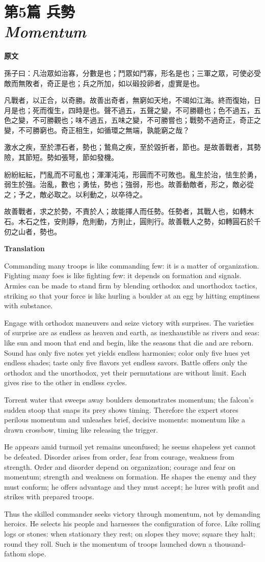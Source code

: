 \documentclass[12pt]{book}
\newcommand{\chapterentry}[4]{%
  \chapter[\texorpdfstring{#1}{#1}]{\texorpdfstring{#1\\\Large\textit{#2}}{#1 — #2}}%
  \noindent\textbf{原文}\par
  #3

  \bigskip
  \noindent\textbf{Translation}\par
  #4
}
\begin{document}
\chapterentry{第5篇 兵勢}{Momentum}{%
孫子曰：凡治眾如治寡，分數是也；鬥眾如鬥寡，形名是也；三軍之眾，可使必受敵而無敗者，奇正是也；兵之所加，如以碫投卵者，虛實是也。

凡戰者，以正合，以奇勝。故善出奇者，無窮如天地，不竭如江海。終而復始，日月是也；死而復生，四時是也。聲不過五，五聲之變，不可勝聽也；色不過五，五色之變，不可勝觀也；味不過五，五味之變，不可勝嘗也；戰勢不過奇正，奇正之變，不可勝窮也。奇正相生，如循環之無端，孰能窮之哉？

激水之疾，至於漂石者，勢也；鷙鳥之疾，至於毀折者，節也。是故善戰者，其勢險，其節短。勢如張弩，節如發機。

紛紛紜紜，鬥亂而不可亂也；渾渾沌沌，形圓而不可敗也。亂生於治，怯生於勇，弱生於強。治亂，數也；勇怯，勢也；強弱，形也。故善動敵者，形之，敵必從之；予之，敵必取之。以利動之，以卒待之。

故善戰者，求之於勢，不責於人；故能擇人而任勢。任勢者，其戰人也，如轉木石。木石之性，安則靜，危則動，方則止，圓則行。故善戰人之勢，如轉圓石於千仞之山者，勢也。}{%
Commanding many troops is like commanding few: it is a matter of organization. Fighting many foes is like fighting few: it depends on formation and signals. Armies can be made to stand firm by blending orthodox and unorthodox tactics, striking so that your force is like hurling a boulder at an egg by hitting emptiness with substance.

Engage with orthodox maneuvers and seize victory with surprises. The varieties of surprise are as endless as heaven and earth, as inexhaustible as rivers and seas: like sun and moon that end and begin, like the seasons that die and are reborn. Sound has only five notes yet yields endless harmonies; color only five hues yet endless shades; taste only five flavors yet endless savors. Battle offers only the orthodox and the unorthodox, yet their permutations are without limit. Each gives rise to the other in endless cycles.

Torrent water that sweeps away boulders demonstrates momentum; the falcon’s sudden stoop that snaps its prey shows timing. Therefore the expert stores perilous momentum and unleashes brief, decisive moments: momentum like a drawn crossbow, timing like releasing the trigger.

He appears amid turmoil yet remains unconfused; he seems shapeless yet cannot be defeated. Disorder arises from order, fear from courage, weakness from strength. Order and disorder depend on organization; courage and fear on momentum; strength and weakness on formation. He shapes the enemy and they must conform; he offers advantage and they must accept; he lures with profit and strikes with prepared troops.

Thus the skilled commander seeks victory through momentum, not by demanding heroics. He selects his people and harnesses the configuration of force. Like rolling logs or stones: when stationary they rest; on slopes they move; square they halt; round they roll. Such is the momentum of troops launched down a thousand-fathom slope.}
\end{document}
